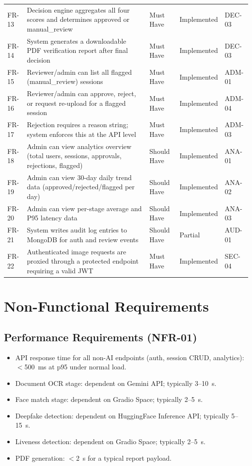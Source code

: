 \documentclass[12pt,a4paper]{report}
\begin{document}
\begin{longtable}{@{}p{1.5cm}p{5cm}p{3cm}p{2.5cm}p{2.5cm}@{}}
FR-13 & Decision engine aggregates all four scores and determines approved or manual\_review & Must Have & Implemented & DEC-03 \\
FR-14 & System generates a downloadable PDF verification report after final decision & Must Have & Implemented & DEC-03 \\
FR-15 & Reviewer/admin can list all flagged (manual\_review) sessions & Must Have & Implemented & ADM-01 \\
FR-16 & Reviewer/admin can approve, reject, or request re-upload for a flagged session & Must Have & Implemented & ADM-04 \\
FR-17 & Rejection requires a reason string; system enforces this at the API level & Must Have & Implemented & ADM-03 \\
FR-18 & Admin can view analytics overview (total users, sessions, approvals, rejections, flagged) & Should Have & Implemented & ANA-01 \\
FR-19 & Admin can view 30-day daily trend data (approved/rejected/flagged per day) & Should Have & Implemented & ANA-02 \\
FR-20 & Admin can view per-stage average and P95 latency data & Should Have & Implemented & ANA-03 \\
FR-21 & System writes audit log entries to MongoDB for auth and review events & Should Have & Partial & AUD-01 \\
FR-22 & Authenticated image requests are proxied through a protected endpoint requiring a valid JWT & Must Have & Implemented & SEC-04 \\
\bottomrule
\end{longtable}

\section{Non-Functional Requirements}

\subsection{Performance Requirements (NFR-01)}
\begin{itemize}
    \item API response time for all non-AI endpoints (auth, session CRUD, analytics): $<$500~ms at p95 under normal load.
    \item Document OCR stage: dependent on Gemini API; typically 3--10~s.
    \item Face match stage: dependent on Gradio Space; typically 2--5~s.
    \item Deepfake detection: dependent on HuggingFace Inference API; typically 5--15~s.
    \item Liveness detection: dependent on Gradio Space; typically 2--5~s.
    \item PDF generation: $<$2~s for a typical report payload.
\end{itemize}
\end{document}
